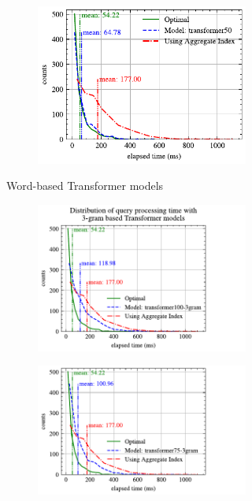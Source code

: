 \documentclass[conference]{IEEEtran}
\begin{document}
\begin{figure}[p]
\begin{subfigure}{0.45\textwidth}
\begin{subfigure}{\textwidth}
			\includegraphics[]{graphics/perf_dist_transformer50_B.pdf}
		\end{subfigure}
		\caption{Word-based Transformer models}
	\end{subfigure}
	\hfill
	\begin{subfigure}{0.45\textwidth}
		\begin{subfigure}{\textwidth}
			\centering
			\includegraphics[]{graphics/perf_dist_transformer100_3gram_B.pdf}
		\end{subfigure}
		\vfill
		\begin{subfigure}{\textwidth}
			\centering
			\includegraphics[]{graphics/perf_dist_transformer75_3gram_B.pdf}

\end{subfigure}
\end{subfigure}
\end{figure}
\end{document}
